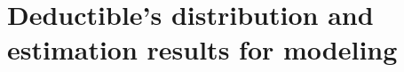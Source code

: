 \documentclass[11pt]{article}
\begin{document}
{%

\FloatBarrier

\section{Deductible's distribution and estimation results for modeling}
\label{app:C}


}
\end{document}
